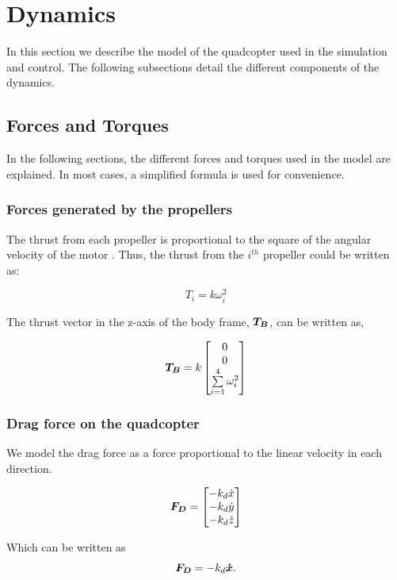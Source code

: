 \documentclass[12pt,fleqn]{article}
\newcommand{\mbm}[1]{\mbox{\boldmath $#1$}}
\begin{document}
\section{Dynamics}
In this section we describe the model of the quadcopter used in the
simulation and control. The following subsections detail the different
components of the dynamics.

\subsection{Forces and Torques}

In the following sections, the different forces and torques used in
the model are explained. In most cases, a simplified formula is used
for convenience. 

\subsubsection{Forces generated by the propellers}

The thrust from each propeller is proportional to the square of the
angular velocity of the motor \cite{Andrew}. Thus, the thrust from the
$i^{th}$ propeller could be written as:

$$ T_i = k\omega_i^2 $$

The thrust vector in the z-axis of the body frame, $\mbm{T_{B}}$, can
be written as, 

\begin{equation} \label{thrust}
$$ \mbm{T_{B}} = k \begin{bmatrix}0 \\ 0\\ \sum \limits_{i=1}^{4}
  \omega_i^2 \end{bmatrix} $$
\end{equation}

\subsubsection{Drag force on the quadcopter}
We model the drag force as a force proportional to the linear velocity
in each direction. 

$$ \mbm{F_D} = \begin{bmatrix} -k_d\dot{x}\\ -k_d\dot{y}\\
  -k_d\dot{z} \end{bmatrix} $$

Which can be written as 
\begin{equation} \label{dragforce}
$$ \mbm{F_D}= -k_d\mbm{\dot{x}}$$.
\end{equation}
\end{document}

